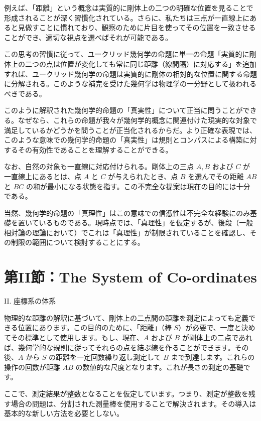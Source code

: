 \documentclass[a4paper,11pt,openany]{ltjsbook}
\begin{document}
例えば、「距離」という概念は実質的に剛体上の二つの明確な位置を見ることで形成されることが深く習慣化されている。さらに、私たちは三点が一直線上にあると見做すことに慣れており、観察のために片目を使ってその位置を一致させることができ、適切な視点を選べばそれが可能である。

この思考の習慣に従って、ユークリッド幾何学の命題に単一の命題「実質的に剛体上の二つの点は位置が変化しても常に同じ距離（線間隔）に対応する」を追加すれば、ユークリッド幾何学の命題は実質的に剛体の相対的な位置に関する命題に分解される。このような補完を受けた幾何学は物理学の一分野として扱われるべきである。

このように解釈された幾何学的命題の「真実性」について正当に問うことができる。なぜなら、これらの命題が我々が幾何学的概念に関連付けた現実的な対象で満足しているかどうかを問うことが正当化されるからだ。より正確な表現では、このような意味での幾何学的命題の「真実性」は規則とコンパスによる構築に対するその有効性であることを理解することができる。

なお、自然の対象も一直線に対応付けられる。剛体上の三点 $A, B$ および $C$ が一直線上にあるとは、点 $A$ と $C$ が与えられたとき、点 $B$ を選んでその距離 $AB$ と $BC$ の和が最小になる状態を指す。この不完全な提案は現在の目的には十分である。

当然、幾何学的命題の「真理性」はこの意味での信憑性は不完全な経験にのみ基礎を置いているものである。現時点では、「真理性」を仮定するが、後段（一般相対論の理論において）でこれは「真理性」が制限されていることを確認し、その制限の範囲について検討することにする。


\clearpage
\chapter{第II節：The System of Co-ordinates}

II.
座標系の体系


物理的な距離の解釈に基づいて、剛体上の二点間の距離を測定によっても定義できる位置にあります。この目的のために、「距離」（棒 $S$）が必要で、一度と決めてその標準として使用します。もし、現在、$A$ および $B$ が剛体上の二点であれば、幾何学的な規則に従ってそれらの点を結ぶ線を作ることができます。その後、$A$ から $S$ の距離を一定回数繰り返し測定して $B$ まで到達します。これらの操作の回数が距離 $AB$ の数値的な尺度となります。これが長さの測定の基礎です。

 ここで、測定結果が整数となることを仮定しています。つまり、測定が整数を残す場合の問題は、分割された測量棒を使用することで解決されます。その導入は基本的な新しい方法を必要としない。
\end{document}
